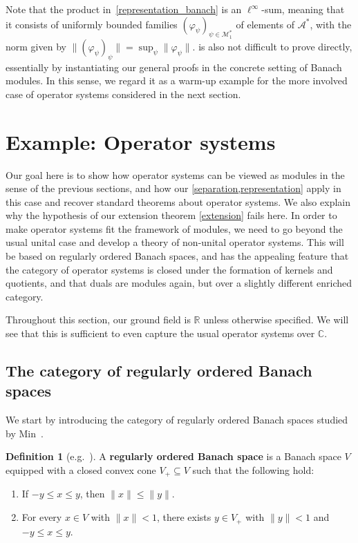 \documentclass[11pt,onecolumn]{article}
\newcommand{\R}{\mathbb{R}}
\newcommand{\C}{\mathbb{C}}
\theoremstyle{plain}
\theoremstyle{remark}
\theoremstyle{definition}
\newtheorem{definition}[definition]{Definition}
\begin{document}
Note that the product in~\eqref{representation_banach} is an $\ell^\infty$-sum, meaning that it consists of uniformly bounded families $(\varphi_\psi)_{\psi \in \mathcal{M}_1^*}$ of elements of $\mathcal{A}^*$, with the norm given by $\|(\varphi_\psi)_\psi\| = \sup_\psi \|\varphi_\psi\|$.
 is also not difficult to prove directly, essentially by instantiating our general proofs in the concrete setting of Banach modules.
In this sense, we regard it as a warm-up example for the more involved case of operator systems considered in the next section.

\section{Example: Operator systems}
\label{operator_systems}

Our goal here is to show how operator systems can be viewed as modules in the sense of the previous sections,
and how our \cref{separation,representation} apply in this case and recover standard theorems about operator systems.
We also explain why the hypothesis of our extension theorem \cref{extension} fails here.
In order to make operator systems fit the framework of modules, we need to go beyond the usual unital case and develop a theory of non-unital operator systems.
This will be based on regularly ordered Banach spaces, and has the appealing feature that the category of operator systems is closed under the formation of kernels and quotients,
and that duals are modules again, but over a slightly different enriched category.

Throughout this section, our ground field is $\R$ unless otherwise specified.
We will see that this is sufficient to even capture the usual operator systems over $\C$.

\subsection{The category of regularly ordered Banach spaces}
\label{sec:regularly_ordered_banach_spaces}

We start by introducing the category of regularly ordered Banach spaces studied by Min~\cite{MinExponentialLaw}.

\begin{definition}[{e.g.~\cite{MinExponentialLaw}}]
	A \textbf{regularly ordered Banach space} is a Banach space $V$ equipped with a closed convex cone $V_+ \subseteq V$ such that the following hold:
	\begin{enumerate}
		\item\label{item:regularly_ordered_1}
			If $-y \le x \le y$, then $\|x\| \le \|y\|$.
		\item\label{item:regularly_ordered_2}
			For every $x \in V$ with $\|x\| < 1$, there exists $y \in V_+$ with $\|y\| < 1$ and $-y \le x \le y$.
	\end{enumerate}
\end{definition}
\end{document}
